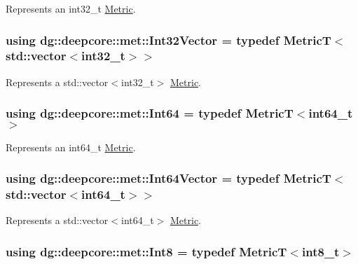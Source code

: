 Represents an {\ttfamily int32\+\_\+t} \hyperlink{classdg_1_1deepcore_1_1_metric}{Metric}. 

\subsubsection[{\texorpdfstring{Int32\+Vector}{Int32Vector}}]{\setlength{\rightskip}{0pt plus 5cm}using {\bf dg\+::deepcore\+::met\+::\+Int32\+Vector} = typedef MetricT$<$std\+::vector$<$int32\+\_\+t$>$$>$}\hypertarget{group___process_metrics_gad3e39491733d99cfde41c0cb422cd8a8}{}\label{group___process_metrics_gad3e39491733d99cfde41c0cb422cd8a8}


Represents a {\ttfamily std\+::vector$<$int32\+\_\+t$>$} \hyperlink{classdg_1_1deepcore_1_1_metric}{Metric}. 

\subsubsection[{\texorpdfstring{Int64}{Int64}}]{\setlength{\rightskip}{0pt plus 5cm}using {\bf dg\+::deepcore\+::met\+::\+Int64} = typedef MetricT$<$int64\+\_\+t$>$}\hypertarget{group___process_metrics_ga97b1089cad8551af2bcb35e88a034469}{}\label{group___process_metrics_ga97b1089cad8551af2bcb35e88a034469}


Represents an {\ttfamily int64\+\_\+t} \hyperlink{classdg_1_1deepcore_1_1_metric}{Metric}. 

\subsubsection[{\texorpdfstring{Int64\+Vector}{Int64Vector}}]{\setlength{\rightskip}{0pt plus 5cm}using {\bf dg\+::deepcore\+::met\+::\+Int64\+Vector} = typedef MetricT$<$std\+::vector$<$int64\+\_\+t$>$$>$}\hypertarget{group___process_metrics_ga3ddb8408babcd7b925afa426f1d9e32c}{}\label{group___process_metrics_ga3ddb8408babcd7b925afa426f1d9e32c}


Represents a {\ttfamily std\+::vector$<$int64\+\_\+t$>$} \hyperlink{classdg_1_1deepcore_1_1_metric}{Metric}. 

\subsubsection[{\texorpdfstring{Int8}{Int8}}]{\setlength{\rightskip}{0pt plus 5cm}using {\bf dg\+::deepcore\+::met\+::\+Int8} = typedef MetricT$<$int8\+\_\+t$>$}\hypertarget{group___process_metrics_gaa1a7c0e8050673a6327d8856f334ec10}{}\label{group___process_metrics_gaa1a7c0e8050673a6327d8856f334ec10}


